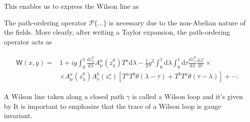 This enables us to express the {\sffamily\color{ming}Wilson line} as

\begin{note}
The {\sffamily\color{ming}path-ordering} operator $\mathcal{P}\{\ldots\}$ is necessary due to the non-Abelian nature of the fields. More clearly, after writing a Taylor expansion, the path-ordering operator acts as
\begin{fullwidth}
\begin{align*}
    \begin{aligned}
    \textsf{W}(x, y)=& 1+i g \int_{0}^{1} \frac{\mathrm{d} z^{\mu}_\lambda}{\mathrm{d} \lambda} A_{\mu}^{a}(z_\lambda^\mu) T^{a} \mathrm{d} \lambda-\frac{1}{2} g^{2} \int_{0}^{1} \mathrm{d} \lambda \int_{0}^{1} \mathrm{d} \tau \frac{\mathrm{d} z^{\mu}_\lambda}{\mathrm{d} \lambda} \frac{\mathrm{d} z^{\nu}_\tau}{\mathrm{d} \tau}\times\\
    & \times A_{\mu}^{a}(z_\lambda^\mu) A_{\nu}^{b}(z_\tau^\nu)\left[T^{a} T^{b} \theta(\lambda-\tau)+T^{b} T^{a} \theta(\tau-\lambda)\right]+\cdots.
\end{aligned}
\end{align*}
\end{fullwidth}
\end{note}

A Wilson line taken along a closed path $\gamma$ is called a {\sffamily\color{ming}Wilson loop} and it's given by
It is important to emphasize that the trace of a Wilson loop is gauge invariant.

